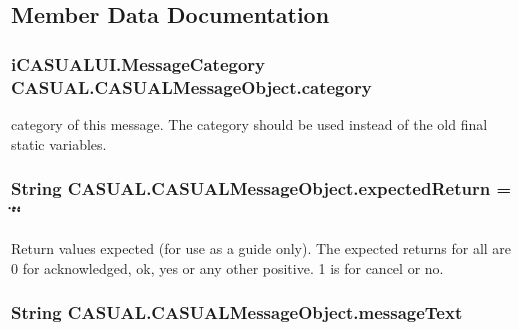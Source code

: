 \subsection{Member Data Documentation}
\hypertarget{class_c_a_s_u_a_l_1_1_c_a_s_u_a_l_message_object_a244858f3a903c9e188344d9eff0f1c7b}{
\subsubsection[{category}]{\setlength{\rightskip}{0pt plus 5cm}i\-C\-A\-S\-U\-A\-L\-U\-I.\-Message\-Category C\-A\-S\-U\-A\-L.\-C\-A\-S\-U\-A\-L\-Message\-Object.\-category}}\label{class_c_a_s_u_a_l_1_1_c_a_s_u_a_l_message_object_a244858f3a903c9e188344d9eff0f1c7b}
category of this message. The category should be used instead of the old final static variables. \hypertarget{class_c_a_s_u_a_l_1_1_c_a_s_u_a_l_message_object_a3ecbe3ab3a844982f085d4e45c3cf66f}{
\subsubsection[{expected\-Return}]{\setlength{\rightskip}{0pt plus 5cm}String C\-A\-S\-U\-A\-L.\-C\-A\-S\-U\-A\-L\-Message\-Object.\-expected\-Return = \char`\"{}\char`\"{}}}\label{class_c_a_s_u_a_l_1_1_c_a_s_u_a_l_message_object_a3ecbe3ab3a844982f085d4e45c3cf66f}
Return values expected (for use as a guide only). The expected returns for all are 0 for acknowledged, ok, yes or any other positive. 1 is for cancel or no. \hypertarget{class_c_a_s_u_a_l_1_1_c_a_s_u_a_l_message_object_a39eaae2b27f09933cfeb9089499fede6}{
\subsubsection[{message\-Text}]{\setlength{\rightskip}{0pt plus 5cm}String C\-A\-S\-U\-A\-L.\-C\-A\-S\-U\-A\-L\-Message\-Object.\-message\-Text}}\label{class_c_a_s_u_a_l_1_1_c_a_s_u_a_l_message_object_a39eaae2b27f09933cfeb9089499fede6}

